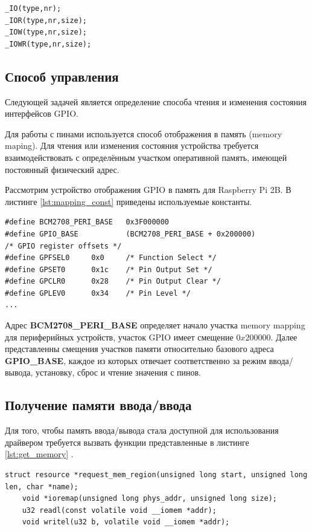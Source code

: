 \begin{lstlisting}[caption = {Макросы команд ioctl}, label=lst:iowr]
_IO(type,nr);
_IOR(type,nr,size);
_IOW(type,nr,size);
_IOWR(type,nr,size);
\end{lstlisting}

\subsection{Способ управления}
Следующей задачей является определение способа чтения и изменения состояния интерфейсов GPIO.

Для работы с пинами используется способ отображения в память (memory maping). Для чтения или изменения состояния устройства требуется взаимодействовать с определённым участком оперативной память, имеющей постоянный физический адрес. 

Рассмотрим устройство отображения GPIO в память для Raspberry Pi 2B. В листинге \ref{lst:mapping_const} приведены используемые константы\cite{subj:gpio_addr}.
\begin{lstlisting}[caption = {Адреса отображения в память}, label=lst:mapping_const]
#define BCM2708_PERI_BASE	0x3F000000
#define GPIO_BASE           (BCM2708_PERI_BASE + 0x200000) 	
/* GPIO register offsets */
#define GPFSEL0		0x0		/* Function Select */
#define GPSET0		0x1c	/* Pin Output Set */
#define GPCLR0		0x28	/* Pin Output Clear */
#define GPLEV0		0x34	/* Pin Level */
...
\end{lstlisting}

Адрес \textbf{BCM2708\_PERI\_BASE} определяет начало участка memory mapping для периферийных устройств, участок GPIO имеет смещение $0x200000$. Далее представленны смещения участков памяти относительно базового адреса \textbf{GPIO\_BASE}, каждое из которых отвечает соответственно за режим ввода/вывода, установку, сброс и чтение значения с пинов.


\subsection{Получение памяти ввода/ввода}
Для того, чтобы память ввода/вывода стала доступной для использования драйвером требуется вызвать функции представленные в листинге \ref{lst:get_memory} \cite{subj:memory}.

\begin{lstlisting}[caption = {Получение доступа к памяти IO}, label=lst:get_memory]
	struct resource *request_mem_region(unsigned long start, unsigned long len, char *name);
	void *ioremap(unsigned long phys_addr, unsigned long size);
	u32 readl(const volatile void __iomem *addr);
	void writel(u32 b, volatile void __iomem *addr);
\end{lstlisting}

